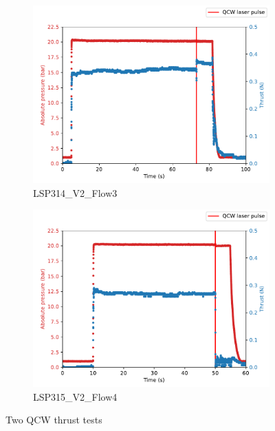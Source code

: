         \begin{figure}[!ht]
            \centering
            \begin{subfigure}[t]{0.45\textwidth}
                \centering
                \includegraphics[width=\textwidth]{assets/4 experiments/LSP314.pdf}
                \caption{LSP314\_V2\_Flow3}
            \end{subfigure}
            \hfill
            \begin{subfigure}[t]{0.45\textwidth}
                \centering
                \includegraphics[width=\textwidth]{assets/4 experiments/LSP315.pdf}
                \caption{LSP315\_V2\_Flow4}
            \end{subfigure}
            \caption{Two QCW thrust tests}
            \label{fig:QCW LSP thrust tests}
        \end{figure}


